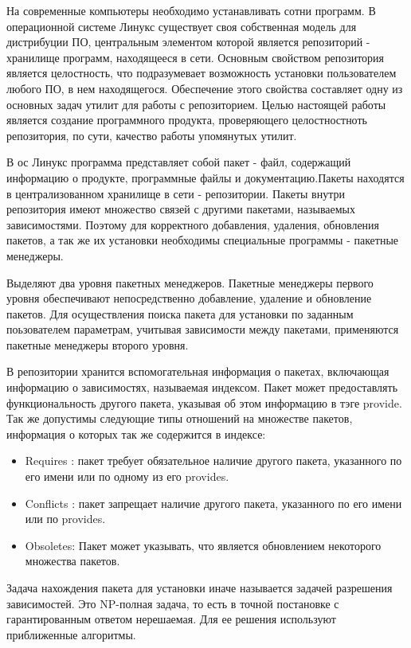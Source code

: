 \documentclass[a4paper]{article}
\begin{document}


На современные компьютеры необходимо устанавливать сотни программ.
В операционной системе Линукс существует своя собственная модель 
для дистрибуции ПО, центральным элементом которой является репозиторий 
- хранилище программ, находящееся в сети. Основным свойством репозитория
 является целостность, что подразумевает возможность установки 
пользователем любого ПО, в нем находящегося. Обеспечение этого 
свойства составляет одну из основных задач утилит для работы с 
репозиторием. Целью настоящей работы является создание программного 
продукта, проверяющего целостностноть репозитория, по сути, качество работы упомянутых утилит.

В ос Линукс программа представляет собой пакет - файл, содержащий 
информацию о продукте, программные файлы и документацию.Пакеты 
находятся в централизованном хранилище в сети - репозитории. 
Пакеты внутри репозитория имеют множество связей с другими пакетами, 
называемых зависимостями. Поэтому для корректного добавления, удаления, 
обновления пакетов, а так же их установки необходимы специальные программы 
- пакетные менеджеры.


Выделяют два уровня пакетных менеджеров. Пакетные менеджеры первого уровня
обеспечивают непосредственно добавление, удаление и обновление пакетов. 
Для осуществления поиска пакета для установки по заданным поьзователем 
параметрам, учитывая зависимости между пакетами, применяются пакетные менеджеры
второго уровня. 

В репозитории хранится вспомогательная информация о пакетах, включающая 
информацию о зависимостях, называемая индексом. Пакет может предоставлять 
функциональность другого пакета, указывая об этом информацию в тэге provide. 
Так же допустимы следующие типы отношений на множестве пакетов, информация 
о которых так же содержится в индексе:
\begin{itemize}
\item
Requires : пакет требует обязательное наличие другого пакета, указанного 
по его имени или по одному из его provides.
\item
Conflicts :
пакет запрещает наличие другого пакета, указанного по его имени или по
provides.
\item 
Obsoletes: Пакет может указывать, что является обновлением некоторого 
множества пакетов. 
\end{itemize}

Задача нахождения пакета для установки иначе называется задачей разрешения 
зависимостей. Это NP-полная задача,  то есть в точной постановке с 
гарантированным ответом нерешаемая. Для ее решения используют приближенные алгоритмы.
\end{document}
